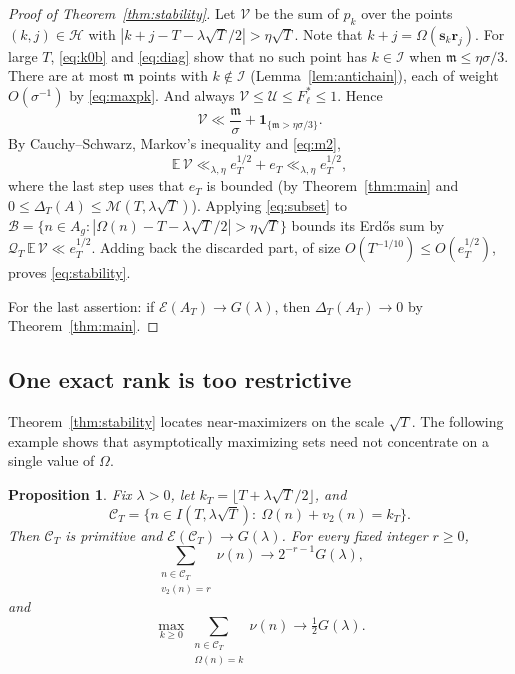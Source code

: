 \documentclass[11pt,a4paper]{article}
\numberwithin{equation}{section}
\theoremstyle{plain}
\newtheorem{proposition}[theorem]{Proposition}
\theoremstyle{definition}
\theoremstyle{remark}
\newcommand{\EE}{\mathbb{E}}
\newcommand{\cE}{\mathcal{E}}
\newcommand{\cM}{\mathcal{M}}
\newcommand{\cH}{\mathcal{H}}
\newcommand{\cI}{\mathcal{I}}
\newcommand{\cU}{\mathcal{U}}
\newcommand{\cV}{\mathcal{V}}
\newcommand{\cC}{\mathcal{C}}
\newcommand{\cB}{\mathcal{B}}
\newcommand{\cQ}{\mathcal{Q}}
\newcommand{\fm}{\mathfrak{m}}
\newcommand{\bs}{\mathbf{s}}
\newcommand{\br}{\mathbf{r}}
\newcommand{\one}{\mathbf{1}}
\begin{document}
\begin{proof}[Proof of Theorem~\ref{thm:stability}]
Let $\cV$ be the sum of $p_k$ over the points $(k,j)\in\cH$ with $|k+j-T-\lambda\sqrt T/2|>\eta\sqrt T$. Note that $k+j=\Omega(\bs_k\br_j)$. For large $T$, \eqref{eq:k0b} and \eqref{eq:diag} show that no such point has $k\in\cI$ when $\fm\le\eta\sigma/3$. There are at most $\fm$ points with $k\notin\cI$ (Lemma~\ref{lem:antichain}), each of weight $O(\sigma^{-1})$ by \eqref{eq:maxpk}. And always $\cV\le\cU\le F^*_\ell\le1$. Hence
\[
\cV\ll\frac{\fm}{\sigma}+\one_{\{\fm>\eta\sigma/3\}} .
\]
By Cauchy--Schwarz, Markov's inequality and \eqref{eq:m2},
\[
\EE\,\cV\ll_{\lambda,\eta}e_T^{1/2}+e_T\ll_{\lambda,\eta}e_T^{1/2},
\]
where the last step uses that $e_T$ is bounded (by Theorem~\ref{thm:main} and $0\le\Delta_T(A)\le\cM(T,\lambda\sqrt T)$). Applying \eqref{eq:subset} to $\cB=\{n\in A_g:|\Omega(n)-T-\lambda\sqrt T/2|>\eta\sqrt T\}$ bounds its Erd\H{o}s sum by $\cQ_T\,\EE\,\cV\ll e_T^{1/2}$. Adding back the discarded part, of size $O(T^{-1/10})\le O(e_T^{1/2})$, proves \eqref{eq:stability}.

For the last assertion: if $\cE(A_T)\to G(\lambda)$, then $\Delta_T(A_T)\to0$ by Theorem~\ref{thm:main}.
\end{proof}

\subsection{One exact rank is too restrictive}

Theorem~\ref{thm:stability} locates near-maximizers on the scale $\sqrt T$. The following example shows that asymptotically maximizing sets need not concentrate on a single value of $\Omega$.

\begin{proposition}\label{prop:example}
Fix $\lambda>0$, let $k_T=\lfloor T+\lambda\sqrt T/2\rfloor$, and
\[
\cC_T=\bigl\{n\in I(T,\lambda\sqrt T):\ \Omega(n)+v_2(n)=k_T\bigr\}.
\]
Then $\cC_T$ is primitive and $\cE(\cC_T)\to G(\lambda)$. For every fixed integer $r\ge0$,
\begin{equation}\label{eq:halving}
\sum_{\substack{n\in\cC_T\\ v_2(n)=r}}\nu(n)\longrightarrow2^{-r-1}G(\lambda),
\end{equation}
and
\[
\max_{k\ge0}\sum_{\substack{n\in\cC_T\\ \Omega(n)=k}}\nu(n)\longrightarrow\tfrac12G(\lambda).
\]
\end{proposition}
\end{document}
